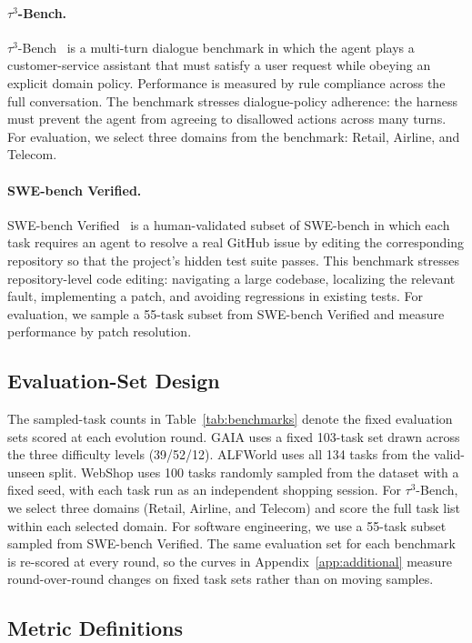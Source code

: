 \paragraph{$\tau^3$-Bench.} $\tau^3$-Bench~\cite{yao2024tau} is a multi-turn dialogue benchmark in which the agent plays a customer-service assistant that must satisfy a user request while obeying an explicit domain policy. Performance is measured by rule compliance across the full conversation. The benchmark stresses dialogue-policy adherence: the harness must prevent the agent from agreeing to disallowed actions across many turns. For evaluation, we select three domains from the benchmark: Retail, Airline, and Telecom.

\paragraph{SWE-bench Verified.} SWE-bench Verified~\cite{jimenez2024swe} is a human-validated subset of SWE-bench in which each task requires an agent to resolve a real GitHub issue by editing the corresponding repository so that the project's hidden test suite passes. This benchmark stresses repository-level code editing: navigating a large codebase, localizing the relevant fault, implementing a patch, and avoiding regressions in existing tests. For evaluation, we sample a 55-task subset from SWE-bench Verified and measure performance by patch resolution.

\subsection{Evaluation-Set Design}
\label{app:evalset}

The sampled-task counts in Table~\ref{tab:benchmarks} denote the fixed evaluation sets scored at each evolution round. GAIA uses a fixed 103-task set drawn across the three difficulty levels (39/52/12). ALFWorld uses all 134 tasks from the valid-unseen split. WebShop uses 100 tasks randomly sampled from the dataset with a fixed seed, with each task run as an independent shopping session. For $\tau^3$-Bench, we select three domains (Retail, Airline, and Telecom) and score the full task list within each selected domain. For software engineering, we use a 55-task subset sampled from SWE-bench Verified. The same evaluation set for each benchmark is re-scored at every round, so the curves in Appendix~\ref{app:additional} measure round-over-round changes on fixed task sets rather than on moving samples.


\subsection{Metric Definitions}
\label{app:metrics}

